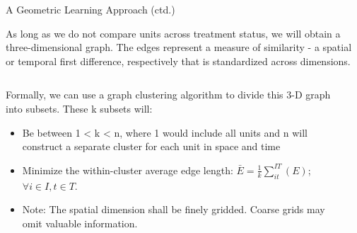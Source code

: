 \begin{frame}{A Geometric Learning Approach (ctd.)}

As long as we do not compare units across treatment status, we will obtain a three-dimensional graph. The edges represent a measure of similarity - a spatial or temporal first difference, respectively that is standardized across dimensions.\\
\vspace{3pt}
\begin{columns}
    \begin{column}{0.85\linewidth}
    Formally, we can use a graph clustering algorithm to divide this 3-D graph into subsets. These k subsets will:
    \begin{itemize}
        \item Be between 1 < k < n, where 1 would include all units and n will construct a separate cluster for each unit in space and time
        \vspace{-7pt}
        \item Minimize the within-cluster average edge length: $\bar{E} = \frac{1}{k}\sum_{it}^{IT}(E)$; $\forall i \in I, t \in T.$
        \item Note: The spatial dimension shall be finely gridded. Coarse grids may omit valuable information. 
    \end{itemize}
    \end{column}
    \begin{column}{0.17\linewidth}

\end{column}
\end{columns}
\end{frame}

